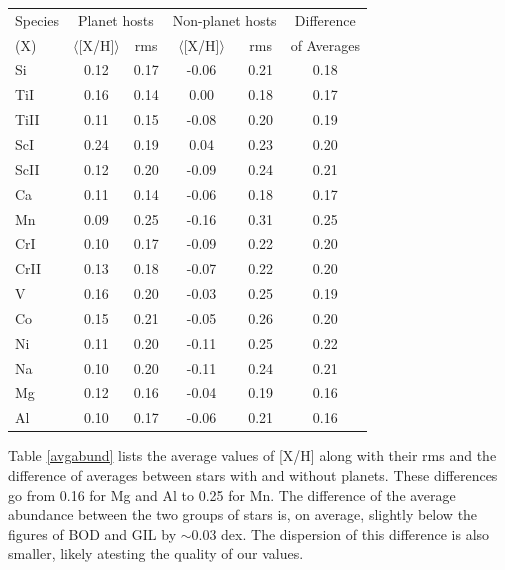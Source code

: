 \documentclass[dvips,12pt,a4paper]{report}
\begin{document}
{{\begin{table}[h!]
\begin{tabular}{ l c c c c c}
\hline
\hline
Species & \multicolumn {2}{c}{Planet hosts} & \multicolumn {2}{c}{Non-planet hosts} & Difference  \\
(X) & $\langle$[X/H]$\rangle$ & rms & $\langle$[X/H]$\rangle$ & rms & of Averages \\
\hline
          Si & 0.12 & 0.17 & -0.06 & 0.21 & 0.18 \\
          TiI & 0.16 & 0.14 & 0.00 & 0.18 & 0.17 \\
        TiII & 0.11 & 0.15 & -0.08 & 0.20 & 0.19\\
          ScI & 0.24 & 0.19 & 0.04 & 0.23 & 0.20\\
        ScII & 0.12 & 0.20 & -0.09 & 0.24 & 0.21\\
          Ca & 0.11 & 0.14 & -0.06 & 0.18 & 0.17\\
          Mn & 0.09 & 0.25 & -0.16 & 0.31 & 0.25\\
          CrI & 0.10 & 0.17 & -0.09 & 0.22 & 0.20\\
        CrII & 0.13 & 0.18 & -0.07 & 0.22 & 0.20\\
           V & 0.16 & 0.20 & -0.03 & 0.25 & 0.19\\
          Co & 0.15 & 0.21 & -0.05 & 0.26 & 0.20\\
          Ni & 0.11 & 0.20 & -0.11 & 0.25 & 0.22\\
          Na & 0.10 & 0.20 & -0.11 & 0.24 & 0.21\\
          Mg & 0.12 & 0.16 & -0.04 & 0.19 & 0.16\\
          Al & 0.10 & 0.17 & -0.06 & 0.21 & 0.16\\
\hline

\end{tabular}
\end{table}

Table \ref{avgabund} lists the average values of [X/H] along with their rms and the difference of averages between stars with and without planets. These differences go from 0.16 for Mg and Al to 0.25 for Mn. %
The difference of the average abundance between the two groups of stars is, on average, slightly below the figures of BOD and GIL by $\sim$0.03 dex. The dispersion of this difference is also smaller, likely atesting the quality of our values.

}}
\end{document}
